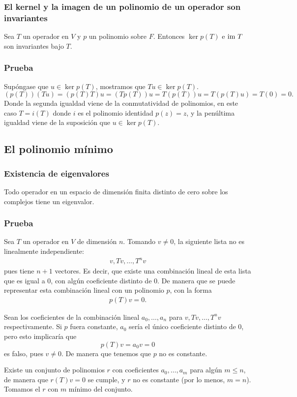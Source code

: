\documentclass{article}
\begin{document}
\subsubsection{El kernel y la imagen de un polinomio de un operador son invariantes}
Sea $T$ un operador en $V$ y $p$ un polinomio sobre $F$. 
Entonces $\ker p(T)$ e $\text{im } T$ son invariantes bajo $T$.
\subsubsection*{Prueba}
Supóngase que $u\in\ker p(T)$, mostramos que $Tu\in\ker p(T)$.
$$(p(T))(Tu)=(p(T)T)u=(Tp(T))u=T(p(T))u=T(p(T)u)=T(0)=0.$$
Donde la segunda igualdad viene de la conmutatividad de
polinomios, en este caso $T=i(T)$ donde $i$ es el polinomio
identidad $p(z)=z$, y la penúltima igualdad viene de la
suposición que $u\in\ker p(T)$.

\subsection{El polinomio mínimo}
\subsubsection{Existencia de eigenvalores}
Todo operador en un espacio de dimensión finita distinto de cero
sobre los complejos tiene un eigenvalor.
\subsubsection*{Prueba}
Sea $T$ un operador en $V$ de dimensión $n$. Tomando $v\neq 0$, la siguiente lista no es linealmente 
independiente:
\begin{align}\label{lista}
    v, Tv, \ldots, T^n v
\end{align}
pues tiene $n+1$ vectores. Es decir, que existe
una combinación lineal de esta lista que es igual a $0$,
con algún coeficiente distinto de $0$. De manera que se
puede representar esta combinación lineal con un polinomio
$p$, con la forma
\begin{align}
    p(T)v = 0.
\end{align}

Sean los coeficientes de la combinación lineal
$a_0,\ldots,a_n$ para $v,Tv,\ldots,T^n v$ respectivamente.
Si $p$ fuera constante, $a_0$ sería
el único coeficiente distinto de $0$, pero
esto implicaría que
$$p(T)v=a_0v =0$$
es falso, pues $v\neq 0$. De manera que tenemos que $p$
no es constante.

Existe un conjunto de polinomios $r$ con
coeficientes $a_0,\ldots,a_m$ para algún $m\leq n$, de 
manera que $r(T)v=0$ se cumple, y $r$ no es constante
(por lo menos, $m=n$).
Tomamos el $r$ con $m$ mínimo del conjunto.
\end{document}
